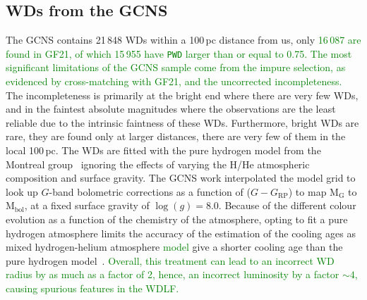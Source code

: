 \documentclass[fleqn,usenatbib]{mnras}
\begin{document}
\subsection{WDs from the GCNS}
The GCNS contains 21\,848 WDs within a 100\,pc distance from us, only
\textcolor{green}{16\,087 are found in GF21, of which 15\,955 have \texttt{PWD} 
larger than or equal to 0.75. The most significant limitations of the GCNS 
sample come from the impure selection, as evidenced by cross-matching with GF21,
and the uncorrected incompleteness.} The incompleteness is primarily at the
bright end where there are very few WDs, and in the 
faintest absolute magnitudes
where the observations are the least reliable due to the intrinsic
faintness of these WDs. Furthermore, bright WDs are rare, they are found only at
larger distances, there are very few of them in the local 100\,pc. The WDs are
fitted with the pure hydrogen model from the Montreal
group~\citep{2019ApJ...876...67B} ignoring the effects of varying
the H/He atmospheric composition and surface gravity. The GCNS work
interpolated the model grid to look up $G$-band bolometric corrections as a
function of ($G - G_{\mathrm{RP}}$) to map M$_\mathrm{G}$ to M$_{\mathrm{bol}}$,
at a fixed surface gravity of $\log(g)=8.0$. Because of the different colour
evolution as a function of the chemistry of the atmosphere, opting to fit a
pure hydrogen atmosphere limits the accuracy of the estimation of the cooling
ages as mixed hydrogen-helium atmosphere \textcolor{green}{model} give a
shorter cooling age than the pure hydrogen model~\citep{2022ApJ...934...36B}.
\textcolor{green}{Overall, this treatment can lead to an incorrect WD radius
by as much as a factor of 2, hence, an incorrect luminosity by a factor
$\sim$$4$, causing spurious features in the WDLF.}
\end{document}
